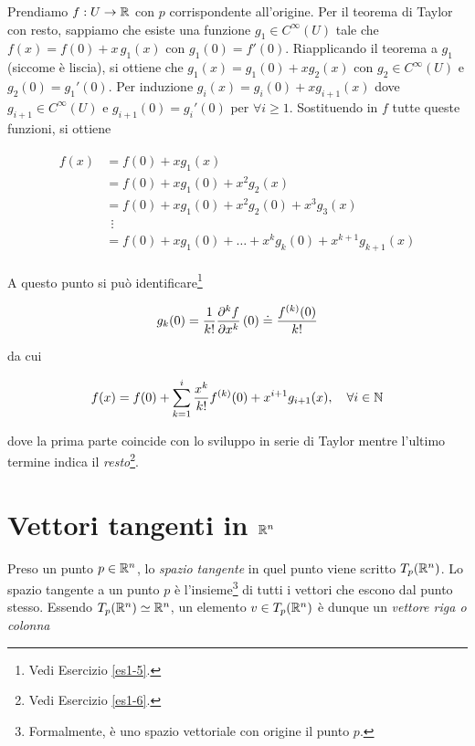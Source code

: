 Prendiamo $ f : U \to \mathbb{R} $ con $ p $ corrispondente all'origine. Per il teorema di Taylor con resto, sappiamo che esiste una funzione $ g_{1} \in C^{\infty}(U) $ tale che $ f(x) = f(0) + x \, g_{1}(x) $ con $ g_{1}(0) = f'(0) $. Riapplicando il teorema a $ g_{1} $ (siccome è liscia), si ottiene che $ g_{1}(x) = g_{1}(0) + x g_{2}(x) $ con $ g_{2} \in C^{\infty}(U) $ e $ g_{2}(0) = g_{1}'(0) $. Per induzione $ g_{i}(x) = g_{i}(0) + x g_{i+1}(x) $ dove $ g_{i+1} \in C^{\infty} (U) $ e $ g_{i+1}(0) = g_{i}'(0) $ per $ \forall i \geqslant 1 $. Sostituendo in $ f $ tutte queste funzioni, si ottiene

\begin{align}
	\begin{split}
			f(x) &= f(0) + x g_{1}(x)\\
			&= f(0) + x g_{1}(0) + x^{2} g_{2}(x)\\
			&= f(0) + x g_{1}(0) + x^{2} g_{2}(0) + x^{3} g_{3}(x)\\
			& \;\, \vdots\\
			&= f(0) + x g_{1}(0) + \dots + x^{k} g_{k}(0) + x^{k+1} g_{k+1}(x)
	\end{split}
\end{align}

A questo punto si può identificare\footnote{%
	Vedi Esercizio \ref{es1-5}.}

\begin{equation}
	g_{k}(0) = \dfrac{1}{k!} \pdv[k]{f}{x} \, (0) \doteq \dfrac{f^{(k)}(0)}{k!}
\end{equation}

da cui

\begin{equation}
	f(x) = f(0) + \sum_{k=1}^{i} \dfrac{x^{k}}{k!} f^{(k)} (0) + x^{i+1} g_{i+1}(x) \qcomma \forall i \in \N
\end{equation}

dove la prima parte coincide con lo sviluppo in serie di Taylor mentre l'ultimo termine indica il \textit{resto}\footnote{%
	Vedi Esercizio \ref{es1-6}.}.

\section{Vettori tangenti in $ \mathbb{R}^{n} $}

Preso un punto $ p \in \mathbb{R}^{n} $, lo \textit{spazio tangente} in quel punto viene scritto $ T_{p}(\mathbb{R}^{n}) $. Lo spazio tangente a un punto $ p $ è l'insieme\footnote{%
	Formalmente, è uno spazio vettoriale con origine il punto $ p $.%
} di tutti i vettori che escono dal punto stesso. Essendo $ T_{p}(\mathbb{R}^{n}) \simeq \mathbb{R}^{n} $, un elemento $ v \in T_{p}(\mathbb{R}^{n}) $ è dunque un \textit{vettore riga o colonna}

